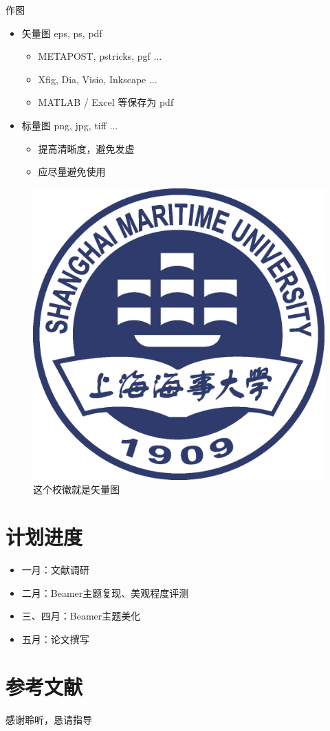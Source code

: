 \documentclass{beamer}
\begin{document}
	\begin{frame}{作图}
		\begin{itemize}
			\item 矢量图 eps, ps, pdf
			\begin{itemize}
				\item METAPOST, pstricks, pgf $\ldots$
				\item Xfig, Dia, Visio, Inkscape $\ldots$
				\item MATLAB / Excel 等保存为 pdf
			\end{itemize}
			\item 标量图 png, jpg, tiff $\ldots$
			\begin{itemize}
				\item 提高清晰度，避免发虚
				\item 应尽量避免使用
			\end{itemize}
		\end{itemize}
		\begin{figure}[htpb]
			\centering
			\includegraphics[width=0.2\linewidth]{Template/Pic/Shanghai_Maritime_University_Logo.eps}
			\caption{这个校徽就是矢量图}
		\end{figure}
	\end{frame}
	
	\section{计划进度}
	\begin{frame}
		\begin{itemize}
			\item 一月：文献调研
			\item 二月：Beamer主题复现、美观程度评测
			\item 三、四月：Beamer主题美化
			\item 五月：论文撰写
		\end{itemize}
	\end{frame}
	
	\section{参考文献}
	
	\begin{frame}[allowframebreaks]
		
		
	\end{frame}
	
	\begin{frame}
		\begin{center}
			{\Huge 感谢聆听，恳请指导}
		\end{center}
	\end{frame}
	
\end{document}
